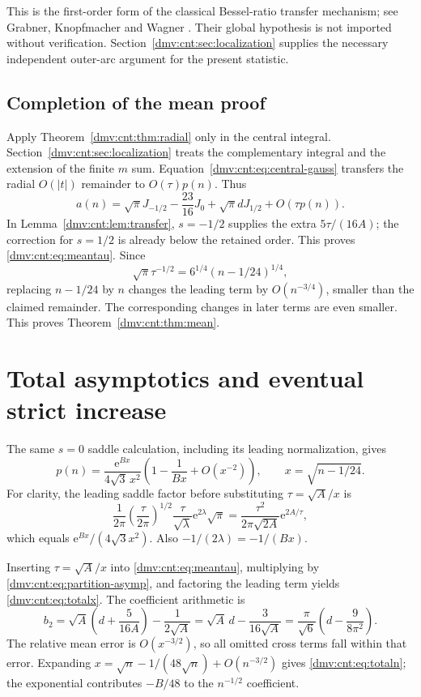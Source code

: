 \documentclass[11pt,letterpaper]{article}
\numberwithin{equation}{section}
\theoremstyle{definition}\newtheorem{definition}[theorem]{Definition}
\theoremstyle{remark}\newtheorem{remark}[theorem]{Remark}
\newcommand{\ee}{\mathrm e}
\begin{document}
This is the first-order form of the classical Bessel-ratio transfer mechanism; see Grabner, Knopfmacher and Wagner \cite{gkw}. Their global hypothesis is not imported without verification. Section~\ref{dmv:cnt:sec:localization} supplies the necessary independent outer-arc argument for the present statistic.

\subsection{Completion of the mean proof}
Apply Theorem~\ref{dmv:cnt:thm:radial} only in the central integral. Section~\ref{dmv:cnt:sec:localization} treats the complementary integral and the extension of the finite $m$ sum. Equation~\eqref{dmv:cnt:eq:central-gauss} transfers the radial $O(|t|)$ remainder to $O(\tau)p(n)$. Thus
\[
a(n)=\sqrt\pi J_{-1/2}-\frac{23}{16}J_0+\sqrt\pi dJ_{1/2}+O(\tau p(n)).
\]
In Lemma~\ref{dmv:cnt:lem:transfer}, $s=-1/2$ supplies the extra $5\tau/(16A)$; the correction for $s=1/2$ is already below the retained order. This proves \eqref{dmv:cnt:eq:meantau}. Since
\[
\sqrt\pi\tau^{-1/2}=6^{1/4}(n-1/24)^{1/4},
\]
replacing $n-1/24$ by $n$ changes the leading term by $O(n^{-3/4})$, smaller than the claimed remainder. The corresponding changes in later terms are even smaller. This proves Theorem~\ref{dmv:cnt:thm:mean}.

\section{Total asymptotics and eventual strict increase}\label{dmv:cnt:sec:total}
The same $s=0$ saddle calculation, including its leading normalization, gives
\begin{equation}\label{dmv:cnt:eq:partition-asymp}
p(n)=\frac{\ee^{Bx}}{4\sqrt3\,x^2}
\left(1-\frac1{Bx}+O(x^{-2})\right),\qquad x=\sqrt{n-1/24}.
\end{equation}
For clarity, the leading saddle factor before substituting $\tau=\sqrt A/x$ is
\[
\frac1{2\pi}\left(\frac\tau{2\pi}\right)^{1/2}
\frac{\tau}{\sqrt\lambda}\ee^{2\lambda}\sqrt\pi
=\frac{\tau^2}{2\pi\sqrt{2A}}\ee^{2A/\tau},
\]
which equals $\ee^{Bx}/(4\sqrt3 x^2)$. Also $-1/(2\lambda)=-1/(Bx)$.

Inserting $\tau=\sqrt A/x$ into \eqref{dmv:cnt:eq:meantau}, multiplying by \eqref{dmv:cnt:eq:partition-asymp}, and factoring the leading term yields \eqref{dmv:cnt:eq:totalx}. The coefficient arithmetic is
\begin{equation}\label{dmv:cnt:eq:b2check}
b_2=\sqrt A\left(d+\frac5{16A}\right)-\frac1{2\sqrt A}
=\sqrt A\,d-\frac3{16\sqrt A}
=\frac\pi{\sqrt6}\left(d-\frac9{8\pi^2}\right).
\end{equation}
The relative mean error is $O(x^{-3/2})$, so all omitted cross terms fall within that error. Expanding $x=\sqrt n-1/(48\sqrt n)+O(n^{-3/2})$ gives \eqref{dmv:cnt:eq:totaln}; the exponential contributes $-B/48$ to the $n^{-1/2}$ coefficient.
\end{document}
